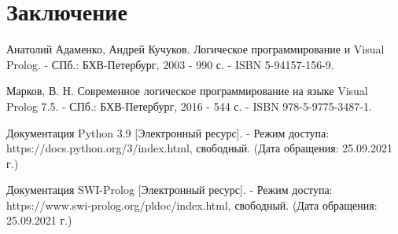 \chapter*{Заключение}

\newpage

\begin{thebibliography}{3}
	Анатолий Адаменко, Андрей Кучуков. Логическое программирование и Visual Prolog. - СПб.: БХВ-Петербург, 2003 - 990 с. - ISBN 5-94157-156-9.
	
	Марков, В. Н. Современное логическое программирование на языке Visual Prolog 7.5. - СПб.: БХВ-Петербург, 2016 - 544 с. - ISBN 978-5-9775-3487-1.
	
	Документация Python 3.9 [Электронный ресурс]. - Режим доступа: https://docs.python.org/3/index.html, свободный. (Дата обращения: 25.09.2021 г.)
	
	Документация SWI-Prolog [Электронный ресурс]. - Режим доступа: https://www.swi-prolog.org/pldoc/index.html, свободный. (Дата обращения: 25.09.2021 г.)
	
\end{thebibliography}